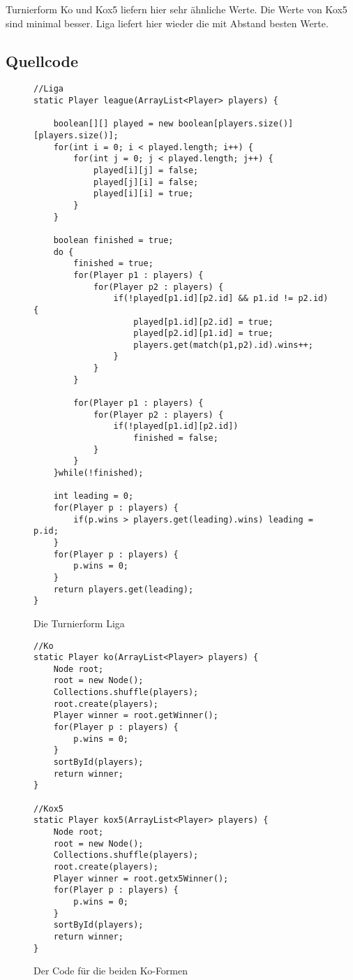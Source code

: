 \documentclass[a4paper, 12pt]{scrartcl}
\begin{document}
Turnierform Ko und Kox5 liefern hier sehr ähnliche Werte. Die Werte von Kox5 sind minimal besser. Liga liefert hier wieder die mit Abstand besten Werte.

\subsection{Quellcode}

\begin{figure}[H]
    \centering
\begin{lstlisting}
//Liga
static Player league(ArrayList<Player> players) {
    
    boolean[][] played = new boolean[players.size()][players.size()];
    for(int i = 0; i < played.length; i++) {
        for(int j = 0; j < played.length; j++) {
            played[i][j] = false;
            played[j][i] = false;
            played[i][i] = true;
        }
    }
    
    boolean finished = true;
    do {
        finished = true;
        for(Player p1 : players) {
            for(Player p2 : players) {
                if(!played[p1.id][p2.id] && p1.id != p2.id) {
                    played[p1.id][p2.id] = true;
                    played[p2.id][p1.id] = true;
                    players.get(match(p1,p2).id).wins++;
                }
            }
        }

        for(Player p1 : players) {
            for(Player p2 : players) {
                if(!played[p1.id][p2.id])
                    finished = false;
            }
        }
    }while(!finished);

    int leading = 0;
    for(Player p : players) {
        if(p.wins > players.get(leading).wins) leading = p.id;
    }
    for(Player p : players) {
        p.wins = 0;
    }
    return players.get(leading);
}
\end{lstlisting}
\caption{Die Turnierform Liga}
\end{figure}

\begin{figure}[H]
    \centering
    \begin{lstlisting}
//Ko
static Player ko(ArrayList<Player> players) {
    Node root;
    root = new Node();
    Collections.shuffle(players);
    root.create(players);
    Player winner = root.getWinner();
    for(Player p : players) {
        p.wins = 0;
    }
    sortById(players);
    return winner;
}

//Kox5
static Player kox5(ArrayList<Player> players) {
    Node root;
    root = new Node();
    Collections.shuffle(players);
    root.create(players);
    Player winner = root.getx5Winner();
    for(Player p : players) {
        p.wins = 0;
    }
    sortById(players);
    return winner;
}
    \end{lstlisting}
    \caption{Der Code für die beiden Ko-Formen}
\end{figure}
\end{document}
